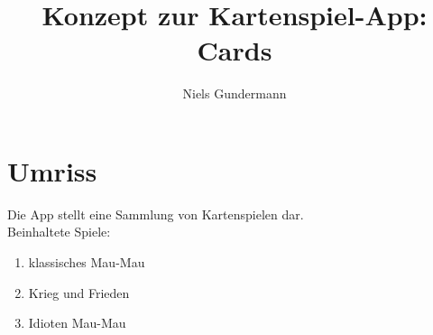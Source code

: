 \documentclass[a4paper]{scrartcl}
\title{Konzept zur Kartenspiel-App: Cards}
\author{Niels Gundermann}
\begin{document}

\large
\maketitle
\pagebreak
\tableofcontents
\pagebreak

\listoffigures
\pagebreak

\section{Umriss}
Die App stellt eine Sammlung von Kartenspielen dar.\\
Beinhaltete Spiele:\\
\begin{enumerate}
	\item klassisches Mau-Mau
	\item Krieg und Frieden
	\item Idioten Mau-Mau
\end{enumerate}
\end{document}
